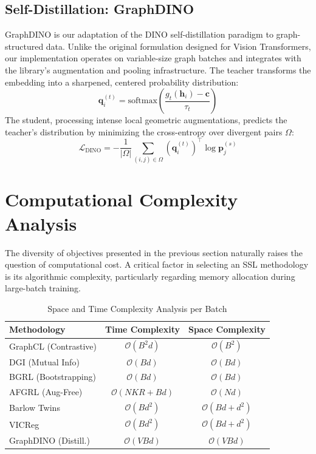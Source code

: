 \documentclass[conference]{IEEEtran}
\begin{document}
\subsection{Self-Distillation: GraphDINO}
GraphDINO is our adaptation of the DINO self-distillation paradigm \cite{dino} to graph-structured data. Unlike the original formulation designed for Vision Transformers, our implementation operates on variable-size graph batches and integrates with the library's augmentation and pooling infrastructure. The teacher transforms the embedding into a sharpened, centered probability distribution:
\begin{equation}
\bm{q}_i^{(t)} = \text{softmax}\left(\frac{g_{t}(\bm{h}_i) - \bm{c}}{\tau_{t}}\right)
\end{equation}
The student, processing intense local geometric augmentations, predicts the teacher's distribution by minimizing the cross-entropy over divergent pairs $\Omega$:
\begin{equation}
\mathcal{L}_{\text{DINO}} = -\frac{1}{| \Omega |} \sum_{(i,j) \in \Omega} \left( \bm{q}_i^{(t)} \right)^\top \log \bm{p}_j^{(s)}
\end{equation}

\section{Computational Complexity Analysis}
The diversity of objectives presented in the previous section naturally raises the question of computational cost. A critical factor in selecting an SSL methodology is its algorithmic complexity, particularly regarding memory allocation during large-batch training.

\begin{table}[htbp]
\centering
\caption{Space and Time Complexity Analysis per Batch}
\label{tab:complexity}
\begin{tabular}{@{}lcc@{}}
\toprule
\textbf{Methodology} & \textbf{Time Complexity} & \textbf{Space Complexity} \\ \midrule
GraphCL (Contrastive) & $\mathcal{O}(B^2 d)$ & $\mathcal{O}(B^2)$ \\
DGI (Mutual Info) & $\mathcal{O}(B d)$ & $\mathcal{O}(B d)$ \\
BGRL (Bootstrapping) & $\mathcal{O}(B d)$ & $\mathcal{O}(B d)$ \\
AFGRL (Aug-Free) & $\mathcal{O}(NKR + Bd)$ & $\mathcal{O}(Nd)$ \\
Barlow Twins & $\mathcal{O}(B d^2)$ & $\mathcal{O}(B d + d^2)$ \\
VICReg & $\mathcal{O}(B d^2)$ & $\mathcal{O}(B d + d^2)$ \\
GraphDINO (Distill.) & $\mathcal{O}(V B d)$ & $\mathcal{O}(V B d)$ \\ \bottomrule
\end{tabular}
\end{table}
\end{document}
